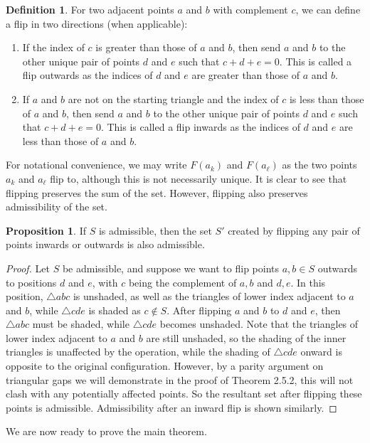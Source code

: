 \documentclass{article}
\theoremstyle{definition}
\newtheorem{definition}[theorem]{Definition}
\newtheorem{prop}[theorem]{Proposition}
\begin{document}
\begin{definition}
    For two adjacent points $a$ and $b$ with complement $c$, we can define a flip in two directions (when applicable):
    \begin{enumerate}
        \item[(1)] If the index of $c$ is greater than those of $a$ and $b$, then send $a$ and $b$ to the other unique pair of points $d$ and $e$ such that $c + d + e = 0$. This is called a flip outwards as the indices of $d$ and $e$ are greater than those of $a$ and $b$.
        \item[(2)] If $a$ and $b$ are not on the starting triangle and the index of $c$ is less than those of $a$ and $b$, then send $a$ and $b$ to the other unique pair of points $d$ and $e$ such that $c + d + e = 0$. This is called a flip inwards as the indices of $d$ and $e$ are less than those of $a$ and $b$.
    \end{enumerate}
\end{definition}
For notational convenience, we may write $F(a_k)$ and $F(a_\ell)$ as the two points $a_k$ and $a_\ell$ flip to, although this is not necessarily unique. It is clear to see that flipping preserves the sum of the set. However, flipping also preserves admissibility of the set.
\begin{prop}
    If $S$ is admissible, then the set $S'$ created by flipping any pair of points inwards or outwards is also admissible.
\end{prop}
\begin{proof}
    Let $S$ be admissible, and suppose we want to flip points $a,b \in S$ outwards to positions $d$ and $e$, with $c$ being the complement of $a,b$ and $d,e$. In this position, $\triangle abc$ is unshaded, as well as the triangles of lower index adjacent to $a$ and $b$, while $\triangle cde$ is shaded as $c \notin S$. After flipping $a$ and $b$ to $d$ and $e$, then $\triangle abc$ must be shaded, while $\triangle cde$ becomes unshaded. Note that the triangles of lower index adjacent to $a$ and $b$ are still unshaded, so the shading of the inner triangles is unaffected by the operation, while the shading of $\triangle cde$ onward is opposite to the original configuration. However, by a parity argument on triangular gaps we will demonstrate in the proof of Theorem 2.5.2, this will not clash with any potentially affected points. So the resultant set after flipping these points is admissible. Admissibility after an inward flip is shown similarly.
\end{proof}
We are now ready to prove the main theorem.
\end{document}
